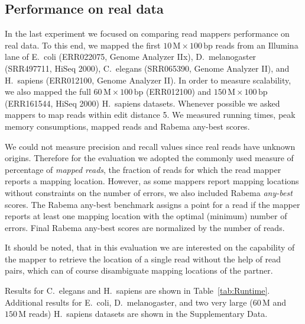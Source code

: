 \begin{table*}[tH!]
  \caption[Variant detection results]
  {
  \label{tab:Variant}
    {\bfseries Variant detection results.} We show the percentages of found origins (recall) and fraction of unique reads mapped to their origin (precision) classed by reads with $s$ SNPs and $i$ indels $(s,i)$.
  }
  \vspace{-3mm}
  \center
  \sffamily
  \resizebox{0.8\textwidth}{!}
  {
	\renewcommand{\tabcolsep}{0.8ex}
	
  }
\end{table*}

\subsection{Performance on real data}

In the last experiment we focused on comparing read mappers performance on real data.
To this end, we mapped the first $10\,\text{M}\times 100\,\text{bp}$ reads from an Illumina lane of E.~coli (ERR022075, Genome Analyzer IIx), D.~melanogaster (SRR497711, HiSeq 2000), C.~elegans (SRR065390, Genome Analyzer II), and H.~sapiens (ERR012100, Genome Analyzer II).
In order to measure scalability, we also mapped the full $60\,\text{M}\times 100\,\text{bp}$ (ERR012100) and $150\,\text{M}\times 100\,\text{bp}$ (ERR161544, HiSeq 2000) H.~sapiens datasets.
Whenever possible we asked mappers to map reads within edit distance 5.
We measured running times, peak memory consumptions, mapped reads and Rabema any-best scores.

We could not measure precision and recall values since real reads have unknown origins. Therefore for the evaluation we adopted the commonly used measure of percentage of \emph{mapped reads}, \ie the fraction of reads for which the read mapper reports a mapping location.
However, as some mappers report mapping locations without constraints on the number of errors, we also included Rabema \emph{any-best} scores.
The Rabema any-best benchmark assigns a point for a read if the mapper reports at least one mapping location with the optimal (minimum) number of errors.
Final Rabema any-best scores are normalized by the number of reads.

It should be noted, that in this evaluation we are interested on the capability of the mapper to retrieve the location of a single read without the help of read pairs, which can of course disambiguate mapping locations of the partner.

Results for C.~elegans and H.~sapiens are shown in Table~\ref{tab:Runtime}.
Additional results for E.~coli, D.~melanogaster, and two very large ($60\,\text{M}$ and $150\,\text{M}$ reads)  H.~sapiens datasets are shown in the Supplementary Data.

